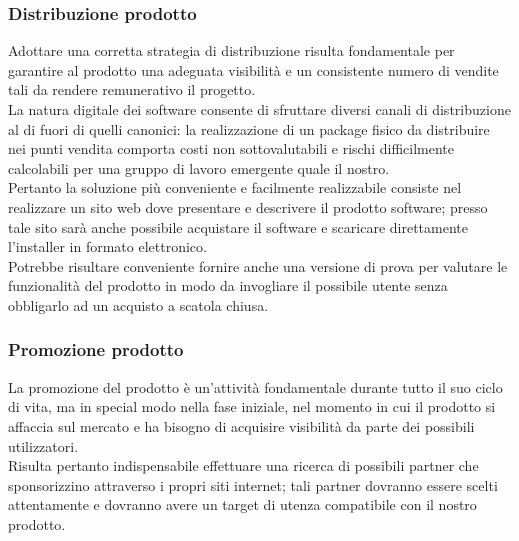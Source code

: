 \subsubsection{Distribuzione prodotto}
Adottare una corretta strategia di distribuzione risulta fondamentale per garantire al prodotto una adeguata visibilità e un consistente numero di vendite tali da rendere remunerativo il progetto.\\
La natura digitale dei software consente di sfruttare diversi canali di distribuzione al di fuori di quelli canonici: la realizzazione di un package fisico da distribuire nei punti vendita comporta costi non sottovalutabili e rischi difficilmente calcolabili per una gruppo di lavoro emergente quale il nostro.\\
Pertanto la soluzione più conveniente e facilmente realizzabile consiste nel realizzare un sito web dove presentare e descrivere il prodotto software; presso tale sito sarà anche possibile acquistare il software e scaricare direttamente l'installer in formato elettronico.\\
Potrebbe risultare conveniente fornire anche una versione di prova per valutare le funzionalità del prodotto in modo da invogliare il possibile utente senza obbligarlo ad un acquisto a scatola chiusa.\\

\subsubsection{Promozione prodotto}
La promozione del prodotto è un'attività fondamentale durante tutto il suo ciclo di vita, ma in special modo nella fase iniziale, nel momento in cui il prodotto si affaccia sul mercato e ha bisogno di acquisire visibilità da parte dei possibili utilizzatori.\\
Risulta pertanto indispensabile effettuare una ricerca di possibili partner che sponsorizzino \NOMEPROGETTO{} attraverso i propri siti internet; tali partner dovranno essere scelti attentamente e dovranno avere un target di utenza compatibile con il nostro prodotto.\\